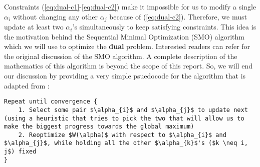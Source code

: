 Constraints (\ref{eq:dual-c1}-\ref{eq:dual-c2}) make it impossible for us to modify a single $\alpha_i$  without changing any other $\alpha_j$ because of (\ref{eq:dual-c2}). Therefore, we must update at least two $\alpha_i$'s simultaneously to keep satisfying constraints. This idea is the motivation behind the Sequential Minimal Optimization (SMO) algorithm which we will use to optimize the \textbf{dual} problem. Interested readers can refer \cite{smo-algorithm} for the original discussion of the SMO algorithm. A complete description of the mathematics of this algorithm is beyond the scope of this report. So, we will end our discussion by providing a very simple psuedocode for the algorithm that is adapted from \cite{svm-andrew-ng}:
\newline
\begin{lstlisting}
Repeat until convergence {
	1. Select some pair $\alpha_{i}$ and $\alpha_{j}$ to update next (using a heuristic that tries to pick the two that will allow us to make the biggest progress towards the global maximum)
	2. Reoptimize $W(\alpha)$ with respect to $\alpha_{i}$ and $\alpha_{j}$, while holding all the other $\alpha_{k}$'s ($k \neq i, j$) fixed
}
\end{lstlisting}